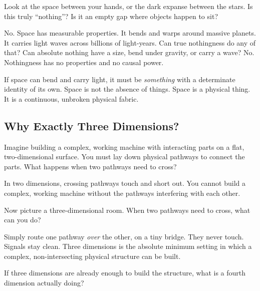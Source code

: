 \documentclass[11pt]{article}
\theoremstyle{canonstyle}
\begin{document}
\begin{reflect}
Look at the space between your hands, or the dark expanse between the stars. Is this truly ``nothing''? Is it an empty gap where objects happen to sit?
\end{reflect}

No. Space has measurable properties. It bends and warps around massive planets. It carries light waves across billions of light-years. Can true nothingness do any of that? Can absolute nothing have a size, bend under gravity, or carry a wave? No. Nothingness has no properties and no causal power. 

If space can bend and carry light, it must be \emph{something} with a determinate identity of its own. Space is not the absence of things. Space is a physical thing. It is a continuous, unbroken physical fabric.

\subsection{Why Exactly Three Dimensions?}

\begin{reflect}
Imagine building a complex, working machine with interacting parts on a flat, two-dimensional surface. You must lay down physical pathways to connect the parts. What happens when two pathways need to cross?
\end{reflect}

In two dimensions, crossing pathways touch and short out. You cannot build a complex, working machine without the pathways interfering with each other. 

\begin{reflect}
Now picture a three-dimensional room. When two pathways need to cross, what can you do?
\end{reflect}

Simply route one pathway \emph{over} the other, on a tiny bridge. They never touch. Signals stay clean. Three dimensions is the absolute minimum setting in which a complex, non-intersecting physical structure can be built.

\begin{reflect}
If three dimensions are already enough to build the structure, what is a fourth dimension actually doing?
\end{reflect}
\end{document}
